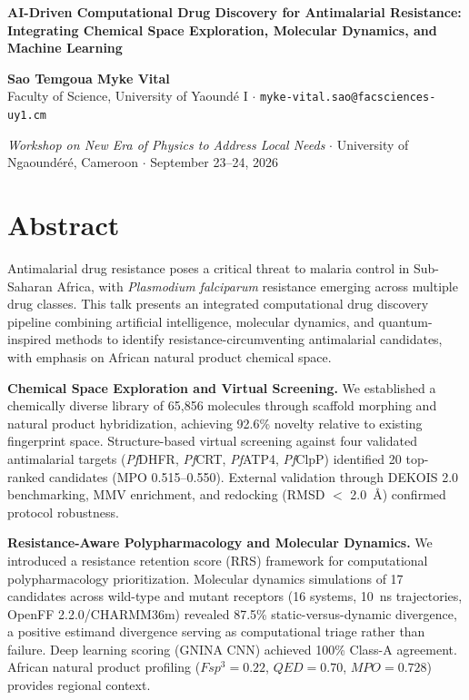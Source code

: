 \documentclass[10pt,a4paper]{article}
\begin{document}
\begin{center}
{\Large\bfseries AI-Driven Computational Drug Discovery for Antimalarial Resistance: \\[0.2em] 
Integrating Chemical Space Exploration, Molecular Dynamics, and Machine Learning}
\vspace{0.25cm}

{\normalsize\bfseries Sao Temgoua Myke Vital}\\[0.1em]
{\small Faculty of Science, University of Yaoundé I $\cdot$ \texttt{myke-vital.sao@facsciences-uy1.cm}}
\vspace{0.25cm}

{\footnotesize\textit{Workshop on New Era of Physics to Address Local Needs} $\cdot$ University of Ngaoundéré, Cameroon $\cdot$ September 23--24, 2026}
\end{center}

\vspace{0.2cm}

\section*{\small Abstract}

Antimalarial drug resistance poses a critical threat to malaria control in Sub-Saharan Africa, with \textit{Plasmodium falciparum} resistance emerging across multiple drug classes. This talk presents an integrated computational drug discovery pipeline combining artificial intelligence, molecular dynamics, and quantum-inspired methods to identify resistance-circumventing antimalarial candidates, with emphasis on African natural product chemical space.

\textbf{Chemical Space Exploration and Virtual Screening.} We established a chemically diverse library of 65,856 molecules through scaffold morphing and natural product hybridization, achieving 92.6\% novelty relative to existing fingerprint space. Structure-based virtual screening against four validated antimalarial targets (\textit{Pf}DHFR, \textit{Pf}CRT, \textit{Pf}ATP4, \textit{Pf}ClpP) identified 20 top-ranked candidates (MPO 0.515--0.550). External validation through DEKOIS 2.0 benchmarking, MMV enrichment, and redocking (RMSD $<$ 2.0~Å) confirmed protocol robustness. 

\textbf{Resistance-Aware Polypharmacology and Molecular Dynamics.} We introduced a resistance retention score (RRS) framework for computational polypharmacology prioritization. Molecular dynamics simulations of 17 candidates across wild-type and mutant receptors (16 systems, 10~ns trajectories, OpenFF 2.2.0/CHARMM36m) revealed 87.5\% static-versus-dynamic divergence, a positive estimand divergence serving as computational triage rather than failure. Deep learning scoring (GNINA CNN) achieved 100\% Class-A agreement. African natural product profiling ($Fsp^3 = 0.22$, $QED = 0.70$, $MPO = 0.728$) provides regional context. 
\end{document}

